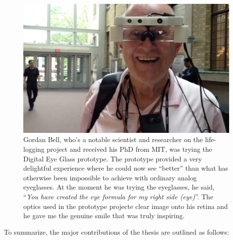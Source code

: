 
\begin{figure}
\center
 \includegraphics[width=5in]{ch7/figures/GordenBell.jpg}
 \caption{ Gordan Bell, who's a notable scientist and researcher on the life-logging project and received his PhD from MIT, was trying the Digital Eye Glass prototype.  The prototype provided a very delightful experience where he could now see ``better'' than what has otherwise been impossible to achieve with ordinary analog eyeglasses. At the moment he was trying the eyeglasses, he said, ``\textit{You have created the eye formula for my right side (eye)}''. The optics used in the prototype projecte clear image onto his retina and he gave me the genuine smile that was truly inspiring.}
 \label{fig:gordanbell}
\end{figure}



To summarize, the major contributions of the thesis are outlined as follows: 

